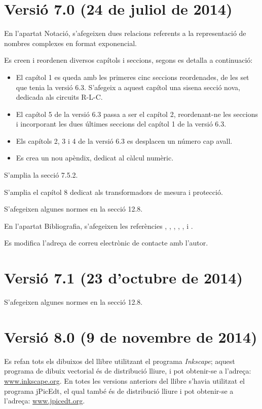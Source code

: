 \section*{Versió 7.0 (24 de juliol de 2014)}

En l'apartat Notació, s'afegeixen dues  relacions referents a la representació de nombres complexes en format exponencial.

Es creen i reordenen diversos capítols i seccions, segons es detalla a continuació:
\begin{itemize}
   \item El capítol 1 es queda amb les primeres cinc seccions reordenades, de les set que tenia la versió 6.3. S'afegeix a aquest capítol una sisena secció nova, dedicada als circuits R-L-C.
   \item El capítol 5 de la versió 6.3 passa a ser el capítol 2, reordenant-ne les  seccions i incorporant les dues últimes seccions del capítol 1 de la versió 6.3.
   \item Els capítols 2, 3 i 4  de la versió 6.3 es desplacen un número cap avall.
   \item Es crea un nou apèndix, dedicat al càlcul numèric.
\end{itemize}

S'amplia la secció 7.5.2.

S'amplia el capítol 8 dedicat als transformadors de mesura i protecció.

S'afegeixen algunes normes en la secció 12.8.

En l'apartat Bibliografia, s'afegeixen les referències \cite{GOM}, \cite{SPK}, \cite{JDH}, \cite{EJB},  \cite{PMA}, \cite{MAI} i \cite{KNU}.

Es modifica l'adreça de correu electrònic de contacte amb l'autor.


\section*{Versió 7.1 (23 d'octubre de 2014)}

S'afegeixen algunes normes en la secció 12.8.


\section*{Versió 8.0 (9 de novembre de 2014)}

Es refan tots els dibuixos del llibre utilitzant el programa \emph{Inkscape}; aquest programa de dibuix vectorial és de distribució lliure, i pot obtenir-se a l'adreça: \href{http://www.inkscape.org/}{www.inkscape.org}. En totes les versions anteriors del llibre s'havia utilitzat el programa jPicEdt, el qual també és de distribució lliure i pot obtenir-se a l'adreça: \href{http://www.jpicedt.org/}{www.jpicedt.org}.

